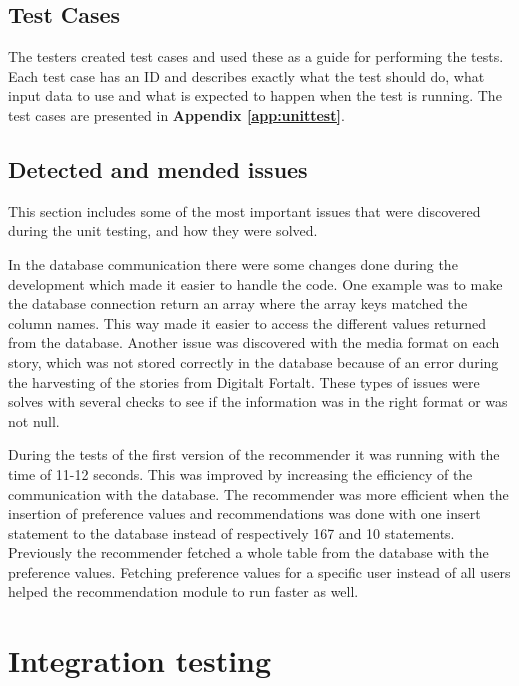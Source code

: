 \subsection{Test Cases}
The testers created test cases and used these as a guide for performing the tests. Each test case has an ID and describes exactly what the test should do, what input data to use and what is expected to happen when the test is running. The test cases are presented in \textbf{Appendix \ref{app:unittest}}.

\subsection{Detected and mended issues}
This section includes some of the most important issues that were discovered during the unit testing, and how they were solved. \newline

In the database communication there were some changes done during the development which made it easier to handle the code. One example was to make the database connection return an array where the array keys matched the column names. This way made it easier to access the different values returned from the database.  
Another issue was discovered with the media format on each story, which was not stored correctly in the database because of an error during the harvesting of the stories from Digitalt Fortalt. These types of issues were solves with several checks to see if the information was in the right format or was not null.\newline

During the tests of the first version of the recommender it was running with the time of 11-12 seconds. This was improved by increasing the efficiency of the communication with the database. The recommender was more efficient when the insertion of preference values and recommendations was done with one insert statement to the database instead of respectively 167 and 10 statements. Previously the recommender fetched a whole table from the database with the preference values. Fetching preference values for a specific user instead of all users helped the recommendation module to run faster as well.

\section{Integration testing}
\label{sec:integration_testing}

